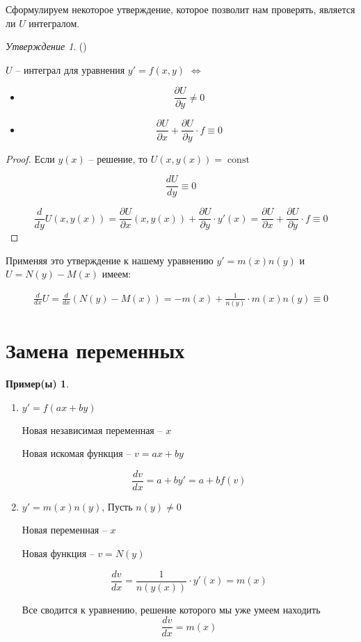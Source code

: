 \documentclass[a4paper]{article}
\theoremstyle{indented}
\theoremstyle{definition}
\newtheorem*{exl}{Пример(ы)}
\theoremstyle{remark}
\newtheorem*{stat}{Утверждение}
\DeclareMathOperator{\const}{const}
\begin{document}
Сформулируем некоторое утверждение, которое позволит нам проверять, является ли  $U$ интегралом.

\begin{stat}
  ()

  $U$ -- интеграл для уравнения $y' = f(x,y)$ $\Longleftrightarrow$
  \begin{itemize}
  \item \[\frac{\partial U}{\partial y} \not = 0\]
  \item \[\frac{\partial U}{\partial x} + \frac{\partial U}{\partial y} \cdot f \equiv 0\]
  \end{itemize}
\end{stat}

\begin{proof}
  Если $y(x)$ -- решение, то $U(x,y(x)) = \const$

  \[\frac{dU}{dy} \equiv 0
  \]

  \[\frac{d}{dy} U(x,y(x)) = \frac{\partial U}{\partial x}(x, y(x))  + \frac{\partial U}{\partial y} \cdot y'(x) =  \frac{\partial U}{\partial x} + \frac{\partial U}{\partial y} \cdot f \equiv 0
  \]
\end{proof}


Применяя это утверждение к нашему уравнению $y' = m(x)n(y)$ и $U = N(y) - M(x)$ имеем:

\begin{equation}
  \begin{gathered}
    \frac{d}{dx} U = \frac{d}{dx} (N(y) - M(x)) = -m(x) + \frac{1}{n(y)} \cdot m(x)n(y) \equiv 0
  \end{gathered}
\end{equation}

\section{Замена переменных}

\begin{exl}
  \begin{enumerate}
  \item $y' = f(ax +by)$
    
    Новая независимая переменная -- $x$

    Новая искомая функция -- $v = ax+by$

    \[\frac{dv}{dx} = a+by' = a + bf(v)\]

  \item $y' = m(x) n(y)$,  Пусть $n(y) \neq 0 $

    Новая переменная -- $x$

    Новая функция -- $v = N(y)$

    \[\frac{dv}{dx} = \frac{1}{n(y(x))} \cdot y'(x) = m(x)\]
    
    Все сводится к уравнению, решение которого мы уже умеем находить
    \[\frac{dv}{dx} = m(x)\]
    


  \end{enumerate}
\end{exl}
\end{document}
